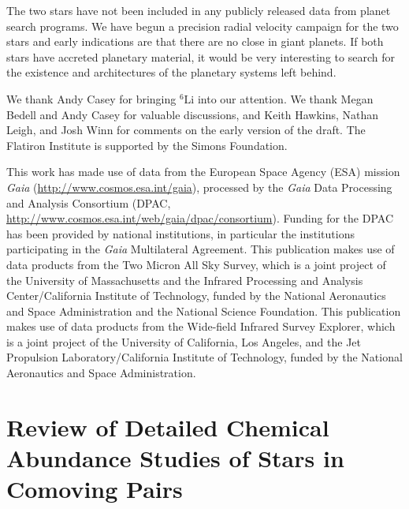 \documentclass[modern, letterpaper]{aastex61}
\newcommand*\elem[1]{\ensuremath{\mathrm{#1}}}
\begin{document}
The two stars have not been included in any publicly released data from planet
search programs.
We have begun a precision radial velocity campaign for the two stars and early
indications are that there are no close in giant planets.
If both stars have accreted planetary material, it would be very interesting to
search for the existence and architectures of the planetary systems left
behind.


\acknowledgements
We thank Andy Casey for bringing $^{6}\elem{Li}$ into our attention.
We thank Megan Bedell and Andy Casey for valuable discussions,
and Keith Hawkins, Nathan Leigh, and Josh Winn for comments
on the early version of the draft.
The Flatiron Institute is supported by the Simons Foundation.

This work has made use of data from the European Space Agency (ESA) mission
{\it Gaia} (\url{http://www.cosmos.esa.int/gaia}), processed by the {\it Gaia}
Data Processing and Analysis Consortium (DPAC,
\url{http://www.cosmos.esa.int/web/gaia/dpac/consortium}). Funding for the DPAC
has been provided by national institutions, in particular the institutions
participating in the {\it Gaia} Multilateral Agreement.
This publication makes use of data products from the Two Micron All Sky Survey,
which is a joint project of the University of Massachusetts and the Infrared
Processing and Analysis Center/California Institute of Technology, funded by
the National Aeronautics and Space Administration and the National Science
Foundation.
This publication makes use of data products from the Wide-field Infrared Survey
Explorer, which is a joint project of the University of California, Los
Angeles, and the Jet Propulsion Laboratory/California Institute of Technology,
funded by the National Aeronautics and Space Administration.




\appendix
\section{
  Review of Detailed Chemical Abundance Studies of Stars in Comoving Pairs}
\label{app:review}
\end{document}
